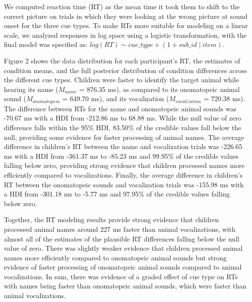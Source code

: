 \documentclass[english,floatsintext,man]{apa6}
\theoremstyle{definition}
\theoremstyle{definition}
\theoremstyle{definition}
\theoremstyle{remark}
\begin{document}
We computed reaction time (RT) as the mean time it took them to shift to
the correct picture on trials in which they were looking at the wrong
picture at sound onset for the three cue types. To make RTs more
suitable for modeling on a linear scale, we analyzed responses in log
space using a logistic transformation, with the final model was
specified as: \(log(RT) \sim cue\_type + (1 + sub\_id \mid item)\).

Figure 2 shows the data distribution for each participant's RT, the
estimates of condition means, and the full posterior distribution of
condition differences across the different cue types. Children were
faster to identify the target animal while hearing its name
(\(M_{name}\) = 876.35 ms), as compared to its onomatopeic animal sound
(\(M_{onomatopeia}\) = 649.70 ms), and its vocalization
(\(M_{vocalization}\) = 720.38 ms). The difference between RTs for the
name and onomatopeic animal sounds was -70.67 ms with a HDI from -212.86
ms to 68.88 ms. While the null value of zero difference falls within the
95\% HDI, 83.50\% of the credible values fall below the null, providing
some evidence for faster processing of animal names. The average
difference in children's RT between the name and vocalization trials was
-226.65 ms with a HDI from -361.37 ms to -85.23 ms and 99.95\% of the
credible values falling below zero, providing strong evidence that
children processed names more efficiently compared to vocalizations.
Finally, the average difference in children's RT between the onomatopeic
sounds and vocalization trials was -155.98 ms with a HDI from -301.18 ms
to -5.77 ms and 97.95\% of the credible values falling below zero.

Together, the RT modeling results provide strong evidence that children
processed animal names around 227 ms faster than animal vocalizations,
with almost all of the estimates of the plausible RT differences falling
below the null value of zero. There was slightly weaker evidence that
children processed animal names more efficiently compared to onomatopeic
animal sounds but strong evidence of faster processing of onomatopeic
animal sounds compared to animal vocalizations. In sum, there was
evidence of a graded effect of cue type on RTs with names being faster
than onomatopeic animal sounds, which were faster than animal
vocalizations.
\end{document}
